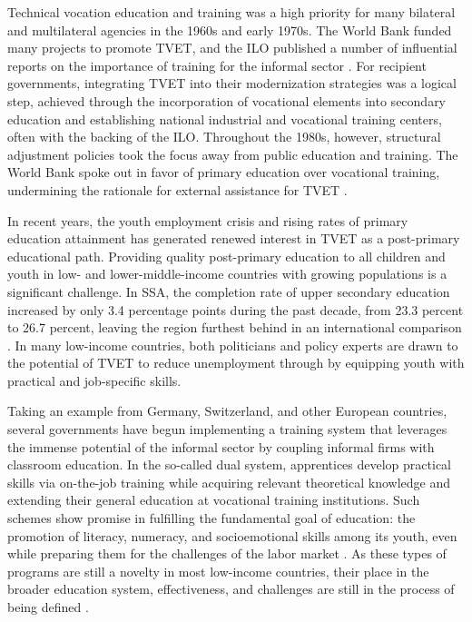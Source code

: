 \documentclass[
  a4paper, twoside, 12pt]{book}
\begin{document}
Technical vocation education and training was a high priority for many bilateral and multilateral agencies in the 1960s and early 1970s. The World Bank funded many projects to promote TVET, and the ILO published a number of influential reports on the importance of training for the informal sector \autocite{palmer2007}. For recipient governments, integrating TVET into their modernization strategies was a logical step, achieved through the incorporation of vocational elements into secondary education and establishing national industrial and vocational training centers, often with the backing of the ILO. Throughout the 1980s, however, structural adjustment policies took the focus away from public education and training. The World Bank spoke out in favor of primary education over vocational training, undermining the rationale for external assistance for TVET \autocite{king2007}.

In recent years, the youth employment crisis and rising rates of primary education attainment has generated renewed interest in TVET as a post-primary educational path. Providing quality post-primary education to all children and youth in low- and lower-middle-income countries with growing populations is a significant challenge. In SSA, the completion rate of upper secondary education increased by only 3.4 percentage points during the past decade, from 23.3 percent to 26.7 percent, leaving the region furthest behind in an international comparison \autocite{un2022}. In many low-income countries, both politicians and policy experts are drawn to the potential of TVET to reduce unemployment through by equipping youth with practical and job-specific skills.

Taking an example from Germany, Switzerland, and other European countries, several governments have begun implementing a training system that leverages the immense potential of the informal sector by coupling informal firms with classroom education. In the so-called dual system, apprentices develop practical skills via on-the-job training while acquiring relevant theoretical knowledge and extending their general education at vocational training institutions. Such schemes show promise in fulfilling the fundamental goal of education: the promotion of literacy, numeracy, and socioemotional skills among its youth, even while preparing them for the challenges of the labor market \autocite{arias2019}. As these types of programs are still a novelty in most low-income countries, their place in the broader education system, effectiveness, and challenges are still in the process of being defined \autocite{igarashi2018}.
\end{document}
